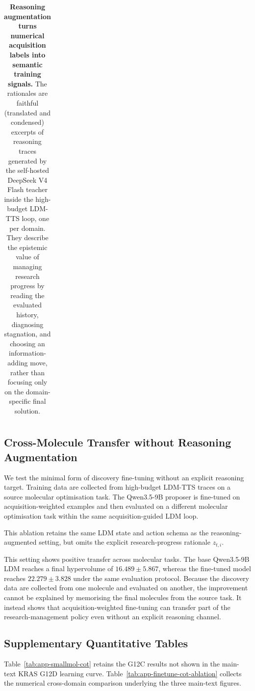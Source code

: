 \begin{table}[H]
\begin{tabular}{@{}p{0.18\linewidth}p{0.36\linewidth}p{0.40\linewidth}@{}}
\bottomrule
\end{tabular}
\vspace{0.5em}
\caption{\textbf{Reasoning augmentation turns numerical acquisition labels into semantic training signals.}
The rationales are faithful (translated and condensed) excerpts of reasoning traces generated by the self-hosted DeepSeek V4 Flash teacher inside the high-budget LDM-TTS loop, one per domain. They describe the epistemic value of managing research progress by reading the evaluated history, diagnosing stagnation, and choosing an information-adding move, rather than focusing only on the domain-specific final solution.}
\label{tab:reasoning-augmentation}
\end{table}

\subsection{Cross-Molecule Transfer without Reasoning Augmentation}
\label{app:finetune-no-augmentation}

We test the minimal form of discovery fine-tuning without an explicit
reasoning target. Training data are collected from high-budget LDM-TTS traces
on a source molecular optimisation task. The Qwen3.5-9B proposer is fine-tuned
on acquisition-weighted examples and then evaluated on a different molecular
optimisation task within the same acquisition-guided LDM loop.

This ablation retains the same LDM state and action schema as the
reasoning-augmented setting, but omits the explicit research-progress
rationale $z_{t,i}$.

This setting shows positive transfer across molecular tasks. The base
Qwen3.5-9B LDM reaches a final hypervolume of $16.489\pm5.867$, whereas the
fine-tuned model reaches $22.279\pm3.828$ under the same evaluation protocol.
Because the discovery data are collected from one molecule and evaluated on
another, the improvement cannot be explained by memorising the final molecules
from the source task. It instead shows that acquisition-weighted fine-tuning
can transfer part of the research-management policy even without an explicit
reasoning channel.

\subsection{Supplementary Quantitative Tables}
\label{app:finetune-tables}

Table~\ref{tab:app-smallmol-cot} retains the G12C results not shown in the
main-text KRAS G12D learning curve. Table~\ref{tab:app-finetune-cot-ablation}
collects the numerical cross-domain comparison underlying the three main-text
figures.

